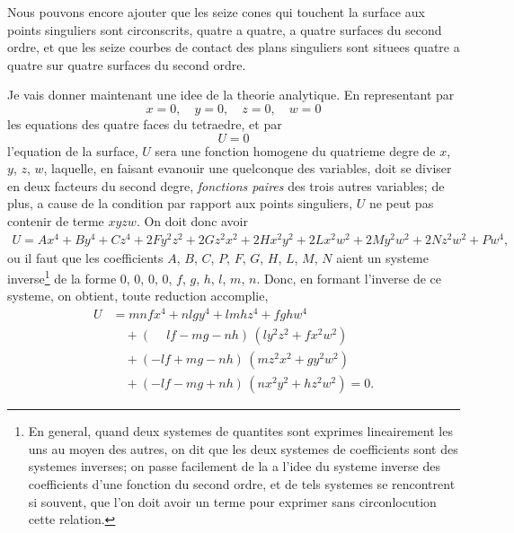 \documentclass[12pt,a4paper]{article}
\theoremstyle{plain}
\begin{document}
Nous pouvons encore ajouter que les seize cones qui touchent la surface aux points singuliers sont circonscrits, quatre a quatre, a quatre surfaces du second ordre, et que les seize courbes de contact des plans singuliers sont situees quatre a quatre sur quatre surfaces du second ordre.

Je vais donner maintenant une idee de la theorie analytique. En representant par
\[
x = 0,\quad y = 0,\quad z = 0,\quad w = 0
\]
les equations des quatre faces du tetraedre, et par
\[
U = 0
\]
l'equation de la surface, $U$ sera une fonction homogene du quatrieme degre de $x$, $y$, $z$, $w$, laquelle, en faisant evanouir une quelconque des variables, doit se diviser en deux facteurs du second degre, \textit{fonctions paires} des trois autres variables; de plus, a cause de la condition par rapport aux points singuliers, $U$ ne peut pas contenir de terme $xyzw$. On doit donc avoir
\begin{multline*}
U = Ax^4 + By^4 + Cz^4 + 2Fy^2z^2 + 2Gz^2x^2 + 2Hx^2y^2 + 2Lx^2w^2 + 2My^2w^2 + 2Nz^2w^2 + Pw^4,
\end{multline*}
ou il faut que les coefficients $A$, $B$, $C$, $P$, $F$, $G$, $H$, $L$, $M$, $N$ aient un systeme inverse\footnote{En general, quand deux systemes de quantites sont exprimes lineairement les uns au moyen des autres, on dit que les deux systemes de coefficients sont des systemes inverses; on passe facilement de la a l'idee du systeme inverse des coefficients d'une fonction du second ordre, et de tels systemes se rencontrent si souvent, que l'on doit avoir un terme pour exprimer sans circonlocution cette relation.} de la forme $0$, $0$, $0$, $0$, $f$, $g$, $h$, $l$, $m$, $n$. Donc, en formant l'inverse de ce systeme, on obtient, toute reduction accomplie,
\begin{align*}
U &= mnfx^4 + nlgy^4 + lmhz^4 + fghw^4 \\
  &\quad + (\phantom{-}lf - mg - nh)\,(ly^2z^2 + fx^2w^2) \\
  &\quad + (-lf + mg - nh)\,(mz^2x^2 + gy^2w^2) \\
  &\quad + (-lf - mg + nh)\,(nx^2y^2 + hz^2w^2) = 0.
\end{align*}
\end{document}
